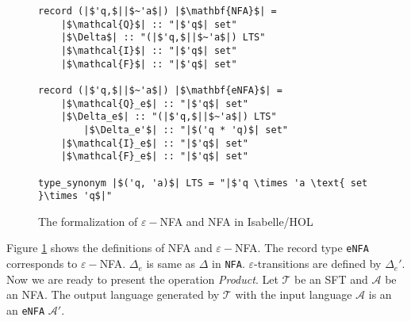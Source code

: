 \documentclass[a4paper,UKenglish,cleveref, autoref, thm-restate]{lipics-v2021}
\begin{document}
\begin{figure}[hbt!]
	\begin{lstlisting}
record (|$'q,$||$~'a$|) |$\mathbf{NFA}$| =
	|$\mathcal{Q}$| :: "|$'q$| set"
	|$\Delta$| :: "(|$'q,$||$~'a$|) LTS"
	|$\mathcal{I}$| :: "|$'q$| set"
	|$\mathcal{F}$| :: "|$'q$| set"

record (|$'q,$||$~'a$|) |$\mathbf{eNFA}$| =
	|$\mathcal{Q}_e$| :: "|$'q$| set"
	|$\Delta_e$| :: "(|$'q,$||$~'a$|) LTS"
        |$\Delta_e'$| :: "|$('q * 'q)$| set"
	|$\mathcal{I}_e$| :: "|$'q$| set"
	|$\mathcal{F}_e$| :: "|$'q$| set"

type_synonym |$('q, 'a)$| LTS = "|$'q \times 'a \text{ set }\times 'q$|"    
	\end{lstlisting}
\caption{The formalization of $\varepsilon-$NFA and NFA in Isabelle/HOL}
\label{fig-def-FAs}
\end{figure}

Figure \ref{fig-def-FAs} shows the definitions of NFA and $\varepsilon-$NFA.
The record type \texttt{eNFA} corresponds to $\varepsilon-$NFA. $\Delta_e$ is same as $\Delta$ in \texttt{NFA}. $\varepsilon$-transitions are defined by $\Delta_e'$.  Now we are ready to present the operation \emph{Product}. Let $\mathcal{T}$ be an SFT and  $\mathcal{A}$ be an NFA. The output language generated by $\mathcal{T}$ with the input language $\mathcal{A}$ is an an \texttt{eNFA} $\mathcal{A}'$. 
\end{document}
